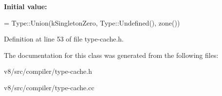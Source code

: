 {\bfseries Initial value\+:}
\begin{DoxyCode}
=
      Type::Union(kSingletonZero, Type::Undefined(), zone())
\end{DoxyCode}


Definition at line 53 of file type-\/cache.\+h.



The documentation for this class was generated from the following files\+:\begin{DoxyCompactItemize}
\item 
v8/src/compiler/type-\/cache.\+h\item 
v8/src/compiler/type-\/cache.\+cc\end{DoxyCompactItemize}

